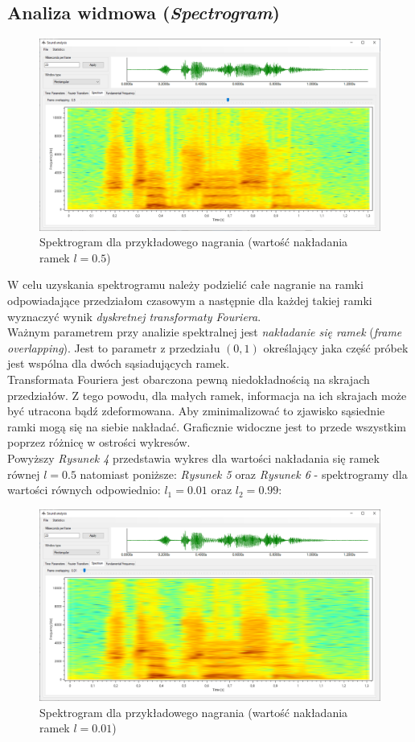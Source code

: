 \documentclass[a4paper]{article}
\begin{document}
\subsection{Analiza widmowa (\textit{Spectrogram})}
\begin{figure}[H]
  \includegraphics[width=\linewidth]{images/04spectrogram.png}
  \caption{Spektrogram dla przykładowego nagrania (wartość nakładania ramek $l=0.5$)}
\end{figure}
W celu uzyskania spektrogramu należy podzielić całe nagranie na ramki odpowiadające przedziałom czasowym a następnie dla każdej takiej ramki wyznaczyć wynik \textit{dyskretnej transformaty Fouriera}.\\
Ważnym parametrem przy analizie spektralnej jest \textit{nakładanie się ramek} (\textit{frame overlapping}). Jest to parametr z przedziału $(0, 1)$ określający jaka część próbek jest wspólna dla dwóch sąsiadujących ramek.\\
Transformata Fouriera jest obarczona pewną niedokładnością na skrajach przedziałów. Z tego powodu, dla małych ramek, informacja na ich skrajach może być utracona bądź zdeformowana. Aby zminimalizować to zjawisko sąsiednie ramki mogą się na siebie nakładać. Graficznie widoczne jest to przede wszystkim poprzez różnicę w ostrości wykresów.\\
Powyższy \textit{Rysunek 4} przedstawia wykres dla wartości nakładania się ramek równej $l = 0.5$ natomiast poniższe: \textit{Rysunek 5} oraz \textit{Rysunek 6} - spektrogramy dla wartości równych odpowiednio: $l_1 = 0.01$ oraz $l_2 = 0.99$:
\begin{figure}[H]
  \includegraphics[width=\linewidth]{images/05spectrogramLowOverlap.png}
  \caption{Spektrogram dla przykładowego nagrania (wartość nakładania ramek $l=0.01$)}
\end{figure}
\end{document}
